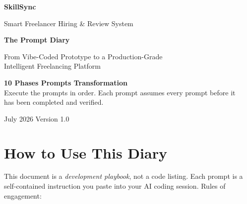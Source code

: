 \documentclass[11pt,a4paper]{article}
\begin{document}
\begin{titlepage}
  \centering
  \vspace*{2.5cm}
  {\Huge\bfseries\color{brandblue} SkillSync\par}
  \vspace{0.4cm}
  {\Large\color{brandink} Smart Freelancer Hiring \& Review System\par}
  \vspace{1.2cm}
  {\huge\bfseries The Prompt Diary\par}
  \vspace{0.5cm}
  {\large From Vibe-Coded Prototype to a Production-Grade\\Intelligent Freelancing Platform\par}
  \vspace{2cm}
  \begin{tcolorbox}[colback=brandmist,colframe=brandline,arc=2mm,width=0.8\textwidth]
    \centering
    \textbf{10 Phases \quad\textbullet{} Prompts \quad\textbullet{} Transformation}\\[2mm]
    Execute the prompts in order. Each prompt assumes every prompt before it\\has been completed and verified.
  \end{tcolorbox}
  \vfill
  {\color{phasegray} July 2026 \quad\textbullet\quad Version 1.0\par}
\end{titlepage}

\tableofcontents
\newpage

\section{How to Use This Diary}

This document is a \emph{development playbook}, not a code listing. Each prompt is a
self-contained instruction you paste into your AI coding session. Rules of engagement:
\end{document}
